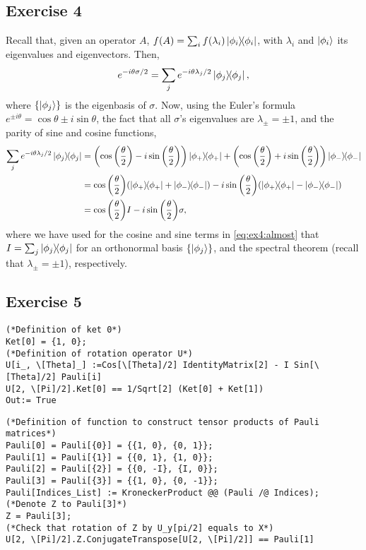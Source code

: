\subsection{Exercise 4}\noindent
Recall that, given an operator $A$, $f(A)=\sum_if(\lambda_i)\dyad{\phi_i}{\phi_i}$,
with $\lambda_i$ and $\ket{\phi_i}$ its eigenvalues and eigenvectors. Then, 
\begin{align}
e^{-i\theta\sigma/2}=\sum_{j}e^{-i\theta\lambda_j/2}\dyad{\phi_j}{\phi_j},
\end{align}
where $\qty{\ket{\phi_j}}$ is the eigenbasis of $\sigma$. Now, using the 
Euler's formula $e^{\pm i\theta}=\cos \theta\pm i\sin\theta$, the fact that 
all $\sigma$'s eigenvalues are $\lambda_{\pm}=\pm 1$, and the parity 
of sine and cosine functions,
\begin{subequations}
\begin{align}
\sum_{j}e^{-i\theta\lambda_j/2}\dyad{\phi_j}{\phi_j}&=
\qty(\cos\qty(\frac{\theta}{2})-i\sin\qty(\frac{\theta}{2}))\dyad{\phi_+}{\phi_+}
+\qty(\cos\qty(\frac{\theta}{2})+i\sin\qty(\frac{\theta}{2}))\dyad{\phi_-}{\phi_-}\\
&=\cos\qty(\frac{\theta}{2})\qty(\dyad{\phi_+}{\phi_+}+\dyad{\phi_-}{\phi_-})
-i\sin\qty(\frac{\theta}{2})\qty(\dyad{\phi_+}{\phi_+}-\dyad{\phi_-}{\phi_-})\label{eq:ex4:almost}\\
&=\cos\qty(\frac{\theta}{2})I-i\sin\qty(\frac{\theta}{2})\sigma,
\end{align}
\end{subequations}
where we have used for the cosine and sine terms in \eqref{eq:ex4:almost}
that $I=\sum_j\dyad{\phi_j}{\phi_j}$ for an orthonormal
basis $\qty{\ket{\phi_j}}$, and the spectral theorem (recall that 
$\lambda_{\pm}=\pm1$), respectively.

\subsection{Exercise 5}
\begin{verbatim}
(*Definition of ket 0*)
Ket[0] = {1, 0};
(*Definition of rotation operator U*)
U[i_, \[Theta]_] :=Cos[\[Theta]/2] IdentityMatrix[2] - I Sin[\[Theta]/2] Pauli[i]
U[2, \[Pi]/2].Ket[0] == 1/Sqrt[2] (Ket[0] + Ket[1])
Out:= True
\end{verbatim}

\begin{verbatim}
(*Definition of function to construct tensor products of Pauli matrices*)
Pauli[0] = Pauli[{0}] = {{1, 0}, {0, 1}};
Pauli[1] = Pauli[{1}] = {{0, 1}, {1, 0}};
Pauli[2] = Pauli[{2}] = {{0, -I}, {I, 0}};
Pauli[3] = Pauli[{3}] = {{1, 0}, {0, -1}};
Pauli[Indices_List] := KroneckerProduct @@ (Pauli /@ Indices);
(*Denote Z to Pauli[3]*)
Z = Pauli[3];
(*Check that rotation of Z by U_y[pi/2] equals to X*)
U[2, \[Pi]/2].Z.ConjugateTranspose[U[2, \[Pi]/2]] == Pauli[1]
\end{verbatim}

